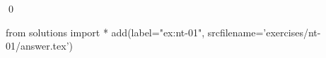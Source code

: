 
\begin{ex} 
  \label{ex:nt-01}
  
  \qed
\end{ex} 
\begin{python0}
from solutions import *
add(label="ex:nt-01",
    srcfilename='exercises/nt-01/answer.tex') 
\end{python0}

